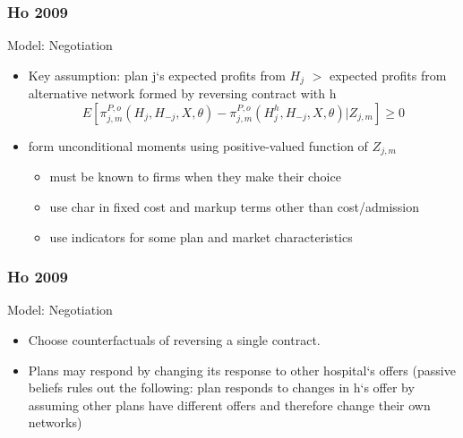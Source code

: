 \documentclass[notes=show]{beamer}
\begin{document}
\begin{frame}
\frametitle{Ho 2009}

Model: Negotiation
\begin{itemize}
\item Key assumption: plan j`s expected profits from $H_{j}$ $>$ expected profits from alternative network formed by reversing contract with h
\[
E[\pi _{j,m}^{P,o}(H_{j},H_{-j},X,\theta )-\pi
_{j,m}^{P,o}(H_{j}^{h},H_{-j},X,\theta )|Z_{j,m}]\geq 0
\]
\item form unconditional moments using positive-valued function of $Z_{j,m}$
\begin{itemize}
\item must be known to firms when they make their choice
\item use char in fixed cost and markup terms other than cost/admission
\item use indicators for some plan and market characteristics
\end{itemize}

\end{itemize}

\end{frame}

\begin{frame}
\frametitle{Ho 2009}

Model: Negotiation
\begin{itemize}
\item Choose counterfactuals of reversing a single contract.
\item Plans may respond by changing its response to other hospital`s offers (passive beliefs rules out the following: plan responds to changes in h`s offer by assuming other plans have different offers and therefore change their own networks)
\end{itemize}

\end{frame}
\end{document}
